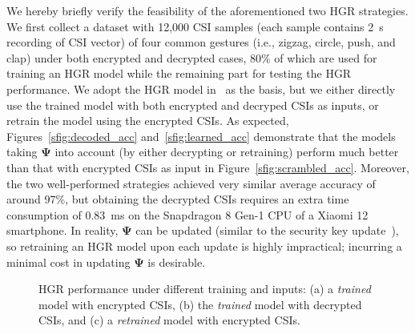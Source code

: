 \documentclass[conference,compsoc]{IEEEtran}
\newcommand{\rev}[1]{{\color{blue}#1}}      %
\newcommand{\rev}[1]{#1}
\begin{document}
We hereby briefly verify the feasibility of the aforementioned two HGR strategies. We first collect a dataset with 12,000 CSI samples (each sample contains 2~\!s recording of CSI vector) of four common gestures (i.e., zigzag, circle, push, and clap) under both encrypted and decrypted cases, 
80\% of which are used for training an HGR model while the remaining part for testing the HGR performance. 
We adopt the HGR model in~\cite{Widar3-MobiSys19} as the basis, but we either directly use the trained model with both encrypted and decryped CSIs as inputs, or retrain the model using the encrypted CSIs. 
%
As expected, Figures~\ref{sfig:decoded_acc} and~\ref{sfig:learned_acc} demonstrate that the models taking $\bm{\Psi}$ into account (by either decrypting or retraining) perform much better than that with encrypted CSIs as input in Figure~\ref{sfig:scrambled_acc}. Moreover, the two well-performed strategies achieved very similar average accuracy of around 97\%, but obtaining the decrypted CSIs requires an extra time consumption of 0.83~\!ms
on the Snapdragon 8 Gen-1 CPU of a Xiaomi 12 smartphone. In reality, $\bm{\Psi}$ can be updated (similar to the security key update~\cite{Keyupdate-1,Keyupdate-CCS21}), so retraining an HGR model upon each update is highly impractical; 
incurring a minimal cost in updating $\bm{\Psi}$ is desirable.
%
\begin{figure}[t]
	\setlength\abovecaptionskip{8pt}
	\vspace{-1.5ex}
	\raggedleft
	\!\!\!\!\!\!\!\!
	\caption{HGR performance under different training and inputs: (a) a \textit{trained} model with encrypted CSIs, (b) the \textit{trained} model with decrypted CSIs, and (c) a \textit{retrained} model with encrypted CSIs.}
	\label{fig:train_retrained}
	\vspace{-1ex}
\end{figure}
\end{document}

